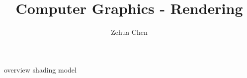 \documentclass[letterpaper, 11pt]{report}
\title{Computer Graphics - Rendering}
\author{Zehua Chen}
\begin{document}
  \maketitle
  \tableofcontents

  {overview}
  {shading}
  {model}
\end{document}
